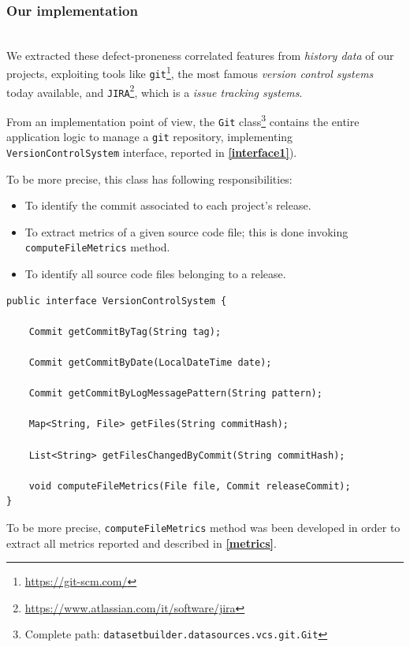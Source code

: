 \documentclass[sigconf]{acmart}
\begin{document}
\subsubsection{Our implementation}
\hfill\\

We extracted these defect-proneness correlated features from \textit{history data} of our projects, exploiting tools like \texttt{git}\footnote{\url{https://git-scm.com/}}, the most famous \textit{version control systems} today available, and \texttt{JIRA}\footnote{\url{https://www.atlassian.com/it/software/jira}}, which is a \textit{issue tracking systems}.

From an implementation point of view, the \texttt{Git} class\footnote{Complete path: \texttt{datasetbuilder.datasources.vcs.git.Git}} contains the entire application logic to manage a \texttt{git} repository, implementing \texttt{Version\-Control\-System} interface, reported in \textbf{\cref{interface1}}). 

To be more precise, this class has following responsibilities: 
\begin{itemize}
\item To identify the commit associated to each project's release.
\item To extract metrics of a given source code file; this is done invoking \texttt{compute\-File\-Metrics} method.
\item To identify all source code files belonging to a release.
\end{itemize}

\begin{lstlisting}[frame=lines,basicstyle=\ttfamily\scriptsize, caption={\texttt{VersionControlSystem} interface}, label={interface1}]
public interface VersionControlSystem {

    Commit getCommitByTag(String tag);

    Commit getCommitByDate(LocalDateTime date);

    Commit getCommitByLogMessagePattern(String pattern);

    Map<String, File> getFiles(String commitHash);

    List<String> getFilesChangedByCommit(String commitHash);

    void computeFileMetrics(File file, Commit releaseCommit);
}
\end{lstlisting}

To be more precise, \texttt{compute\-File\-Metrics} method was been developed in order to extract all metrics reported and described in \textbf{\cref{metrics}}. 
\end{document}
